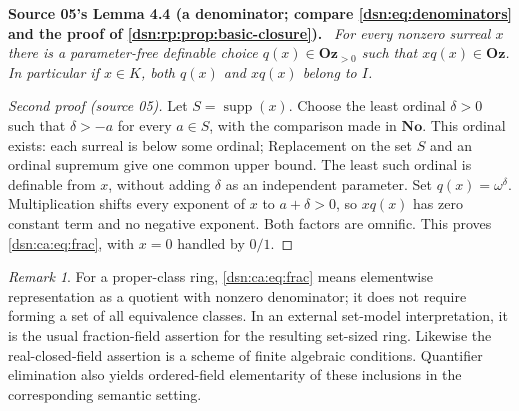 \documentclass[11pt,a4paper]{article}
\numberwithin{equation}{section}
\theoremstyle{definition}
\theoremstyle{remark}
\newtheorem{remark}[remark]{Remark}
\newcommand{\No}{\mathbf{No}}
\newcommand{\Oz}{\mathbf{Oz}}
\newcommand{\supp}{\operatorname{supp}}
\newenvironment{dupstatement}[1]{\par\medskip\noindent\textbf{#1.}\ \begingroup\itshape\ignorespaces}{\endgroup\par\medskip}
\begin{document}
\begin{dupstatement}{Source 05's Lemma 4.4 (a denominator; compare \eqref{dsn:eq:denominators} and the proof of \cref{dsn:rp:prop:basic-closure})}
For every nonzero surreal $x$ there is a parameter-free definable choice
$q(x)\in\Oz_{>0}$ such that $xq(x)\in\Oz$. In particular if $x\in K$,
both $q(x)$ and $xq(x)$ belong to $I$.
\end{dupstatement}
\begin{proof}[Second proof (source 05)]
Let $S=\supp(x)$. Choose the least ordinal $\delta>0$ such that
$\delta>-a$ for every $a\in S$, with the comparison made in $\No$.
This ordinal exists: each surreal is below some ordinal; Replacement
on the set $S$ and an ordinal supremum give one common upper bound.
The least such ordinal is definable from $x$, without adding $\delta$
as an independent parameter. Set $q(x)=\omega^\delta$.
Multiplication shifts every exponent of $x$ to $a+\delta>0$, so
$xq(x)$ has zero constant term and no negative exponent. Both factors
are omnific. This proves \eqref{dsn:ca:eq:frac}, with $x=0$ handled by
$0/1$.
\end{proof}
\begin{remark}
For a proper-class ring, \eqref{dsn:ca:eq:frac} means elementwise representation
as a quotient with nonzero denominator; it does not require forming a
set of all equivalence classes. In an external set-model interpretation,
it is the usual fraction-field assertion for the resulting set-sized
ring. Likewise the real-closed-field assertion is a scheme of finite
algebraic conditions. Quantifier elimination also yields ordered-field
elementarity of these inclusions in the corresponding semantic setting.
\end{remark}
\end{document}
